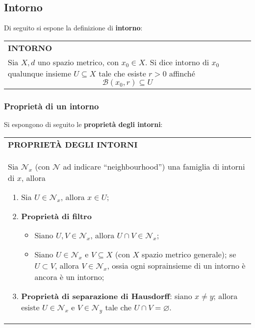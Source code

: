 \documentclass[a4paper]{extarticle}
\newcommand{\quotes}[1]{``#1''}
\renewcommand\arraystretch{}
\begin{document}
\newpage
\subsection{Intorno}
Di seguito si espone la definizione di \textbf{intorno}:

\vspace{1em}
\setlength{\tabcolsep}{14pt}
\renewcommand{\arraystretch}{2}
\noindent
\begin{tabularx}{\textwidth}{@{}|P|@{}}
    \hline
    {\textbf{INTORNO}}\\
    \parbox{\linewidth}{Sia $X,d$ uno spazio metrico, con $x_0 \in X$. Si dice intorno di $x_0$ qualunque insieme $U \subseteq X$ tale che esiste $r>0$ affinché
    \[\mathcal{B}(x_0,r) \subseteq U\]
    \vspace{-1mm}}\\
    \hline
\end{tabularx}

\vspace{1em}
\subsubsection{Proprietà di un intorno}
Si espongono di seguito le \textbf{proprietà degli intorni}:

\vspace{1em}
\setlength{\tabcolsep}{14pt}
\renewcommand{\arraystretch}{2}
\noindent
\begin{tabularx}{\textwidth}{@{}|P|@{}}
    \hline
    {\textbf{PROPRIETÀ DEGLI INTORNI}}\\
    \parbox{\linewidth}{Sia $\mathcal{N}_x$ (con $\mathcal{N}$ ad indicare \quotes{neighbourhood}) una famiglia di intorni di $x$, allora
    \begin{enumerate}
        \item Sia $U \in \mathcal{N}_x$, allora $x \in U$;
        \item \textbf{Proprietà di filtro}
        \begin{itemize}
            \item Siano $U,V \in \mathcal{N}_x$, allora $U \cap V \in \mathcal{N}_x$;
            \item Siano $U \in \mathcal{N}_x$ e $V \subseteq X$ (con $X$ spazio metrico generale); se $U \subset V$, allora $V \in \mathcal{N}_x$, ossia ogni soprainsieme di un intorno è ancora è un intorno;
        \end{itemize}
        \item \textbf{Proprietà di separazione di Hausdorff}: siano $x \neq y$; allora esiste $U \in \mathcal{N}_x$ e $V \in \mathcal{N}_y$ tale che $U \cap V = \varnothing$.
    \end{enumerate}
    \vspace{1mm}}\\
    \hline
\end{tabularx}
\end{document}
